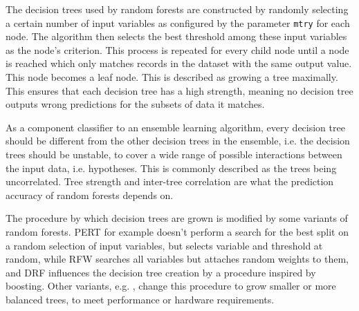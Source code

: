 \documentclass[a4paper,man,12pt,apacite]{apa6} %
\begin{document}

The decision trees used by random forests are constructed by randomly
selecting a certain number of input variables as configured by the parameter
\texttt{mtry} for each node.
The algorithm then selects the best threshold among these input
variables as the node's criterion.
This process is repeated for every child node until a node is reached
which only matches records in the dataset with the same output value.
This node becomes a leaf node.
This is described as growing a tree maximally.
This ensures that each decision tree has a high strength,
meaning no decision tree outputs wrong predictions for the subsets of data
it matches. \cite{breiman2001random}

As a component classifier to an ensemble learning algorithm,
every decision tree should be different from the other decision trees in
the ensemble, i.e. the decision trees should be unstable,
to cover a wide range of possible interactions between the input data,
i.e. hypotheses.
This is commonly described as the trees being uncorrelated.
Tree strength and inter-tree correlation are what the prediction accuracy
of random forests depends on. \cite{breiman2001random}

The procedure by which decision trees are grown is modified by some
variants of random forests.
PERT \cite{cutler2001pert} for example doesn't perform a search for
the best split on a random selection of input variables,
but selects variable and threshold at random, while RFW \cite{maudes2012random}
searches all variables but attaches random weights to them,
and DRF \cite{bernard2012dynamic} influences the decision tree creation
by a procedure inspired by boosting.
Other variants, e.g. \cite{van2012accelerating}, change this procedure to
grow smaller or more balanced trees, to meet performance or
hardware requirements.
\end{document}
